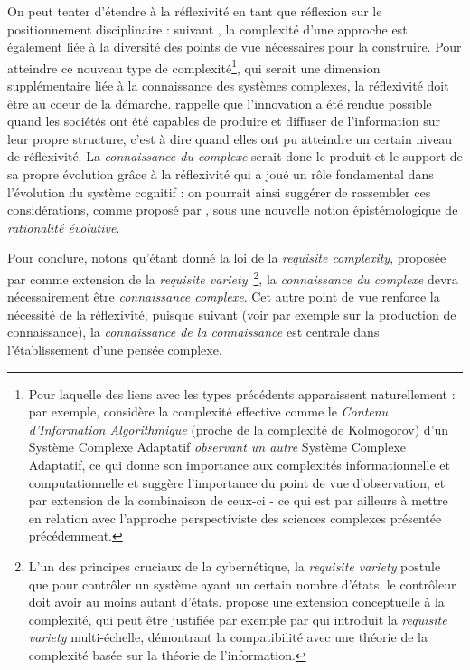 On peut tenter d'étendre à la réflexivité en tant que réflexion sur le positionnement disciplinaire : suivant \cite{pumain2005cumulativite}, la complexité d'une approche est également liée à la diversité des points de vue nécessaires pour la construire. Pour atteindre ce nouveau type de complexité\footnote{Pour laquelle des liens avec les types précédents apparaissent naturellement : par exemple, \cite{gell1995quark} considère la complexité effective comme le \emph{Contenu d'Information Algorithmique} (proche de la complexité de Kolmogorov) d'un Système Complexe Adaptatif \emph{observant un autre} Système Complexe Adaptatif, ce qui donne son importance aux complexités informationnelle et computationnelle et suggère l'importance du point de vue d'observation, et par extension de la combinaison de ceux-ci - ce qui est par ailleurs à mettre en relation avec l'approche perspectiviste des sciences complexes présentée précédemment.}, qui serait une dimension supplémentaire liée à la connaissance des systèmes complexes, la réflexivité doit être au coeur de la démarche. \cite{read2009innovation} rappelle que l'innovation a été rendue possible quand les sociétés ont été capables de produire et diffuser de l'information sur leur propre structure, c'est à dire quand elles ont pu atteindre un certain niveau de réflexivité. La \emph{connaissance du complexe} serait donc le produit et le support de sa propre évolution grâce à la réflexivité qui a joué un rôle fondamental dans l'évolution du système cognitif : on pourrait ainsi suggérer de rassembler ces considérations, comme proposé par , sous une nouvelle notion épistémologique de \emph{rationalité évolutive}.


Pour conclure, notons qu'étant donné la loi de la \emph{requisite complexity}, proposée par \cite{gershenson2015requisite} comme extension de la \emph{requisite variety}~\cite{ashby1991requisite}\footnote{L'un des principes cruciaux de la cybernétique, la \emph{requisite variety} postule que pour contrôler un système ayant un certain nombre d'états, le contrôleur doit avoir au moins autant d'états.  propose une extension conceptuelle à la complexité, qui peut être justifiée par exemple par \cite{allen2017multiscale} qui introduit la \emph{requisite variety} multi-échelle, démontrant la compatibilité avec une théorie de la complexité basée sur la théorie de l'information.}, la \emph{connaissance du complexe} devra nécessairement être \emph{connaissance complexe}. Cet autre point de vue renforce la nécessité de la réflexivité, puisque suivant  (voir par exemple \cite{morin1991methode} sur la production de connaissance), la \emph{connaissance de la connaissance} est centrale dans l'établissement d'une pensée complexe.




